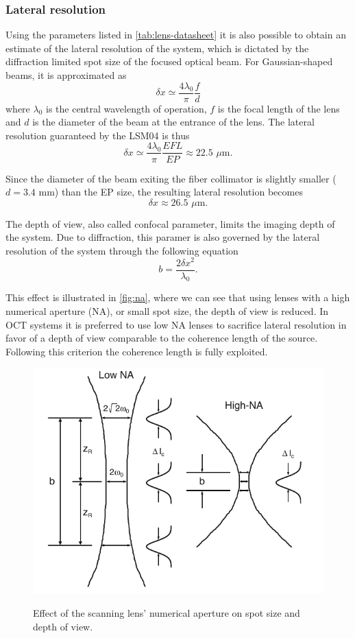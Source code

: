  
 
 \subsubsection{Lateral resolution}
 
 Using the parameters listed in \autoref{tab:lens-datasheet} it is also possible to obtain an estimate of the lateral resolution of the system, which is dictated by the diffraction limited spot size of the focused optical beam. For Gaussian-shaped beams, it is approximated as \cite{Drexler2015}
 \begin{equation}
 	\delta x \simeq \frac{4\lambda_0}{\pi} \frac{f}{d}
 \end{equation}
 where $\lambda_0$ is the central wavelength of operation, $f$ is the focal length of the lens and $d$ is the diameter of the beam at the entrance of the lens. The lateral resolution guaranteed by the LSM04 is thus
 \begin{equation}\label{eq:transversal-resolution-theory}
 	\delta x \simeq \frac{4\lambda_0}{\pi} \frac{EFL}{EP} \approx 22.5 \,\,\mu\text{m.}
 \end{equation}
 
 Since the diameter of the beam exiting the fiber collimator is slightly smaller ($d=3.4$ mm) than the EP size, the resulting lateral resolution becomes
 \begin{equation}
	\delta x \approx 26.5 \,\,\mu\text{m}.
 \end{equation}
 
 The depth of view, also called confocal parameter, limits the imaging depth of the system. Due to diffraction, this paramer is also governed by the lateral resolution of the system through the following equation
 \begin{equation}
	 b = \frac{2 \delta x^2}{\lambda_0}.
 \end{equation}
 
 This effect is illustrated in \autoref{fig:na}, where we can see that using lenses with a high numerical aperture (NA), or small spot size, the depth of view is reduced. In OCT systems it is preferred to use low NA lenses to sacrifice lateral resolution in favor of a depth of view comparable to the coherence length of the source. Following this criterion the coherence length is fully exploited. 
 
  \begin{figure}[bth]
 	\myfloatalign
 	{\includegraphics[width=0.6\linewidth]{gfx/ch3/na}}
 	\caption{Effect of the scanning lens' numerical aperture on spot size and depth of view.}\label{fig:na}
 \end{figure}
 
